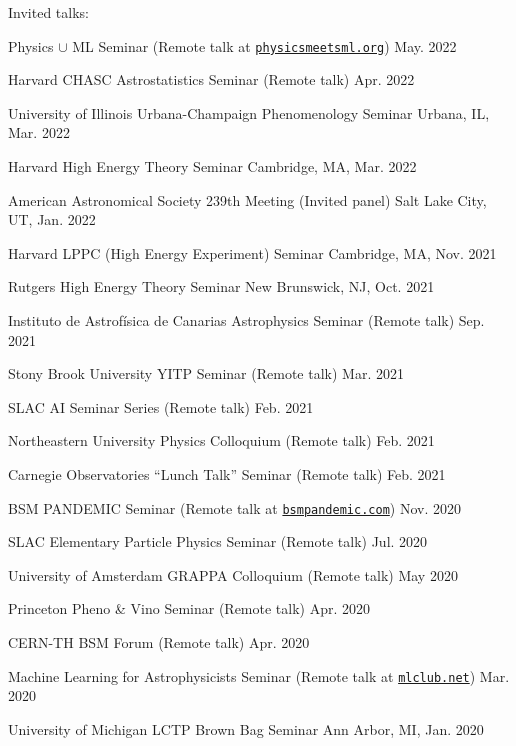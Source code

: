 \documentclass[letterpaper,11pt]{article}
\newenvironment{packed_itemize}{
\begin{itemize}[label=\raisebox{0.25ex}{\tiny$\bullet$}]
  \setlength{\itemsep}{3.9pt}
  \setlength{\parskip}{0pt}
  \setlength{\parsep}{0pt}}{\end{itemize}
}
\begin{document}
\noindent
Invited talks:
\begin{packed_itemize}
  \item Physics $\cup$ ML Seminar (Remote talk at \href{http://www.physicsmeetsml.org//}{\texttt{physicsmeetsml.org}}) \hfill May. 2022
  \item Harvard CHASC Astrostatistics Seminar (Remote talk)  \hfill Apr. 2022
  \item University of Illinois Urbana-Champaign Phenomenology Seminar  \hfill Urbana, IL, Mar. 2022
  \item Harvard High Energy Theory Seminar \hfill Cambridge, MA, Mar. 2022
  \item American Astronomical Society 239th Meeting (Invited panel)  \hfill Salt Lake City, UT, Jan. 2022
  \item Harvard LPPC (High Energy Experiment) Seminar \hfill Cambridge, MA, Nov. 2021
  \item Rutgers High Energy Theory Seminar \hfill New Brunswick, NJ, Oct. 2021
  \item Instituto de Astrof\'{i}sica de Canarias Astrophysics Seminar (Remote talk) \hfill Sep. 2021
  \item Stony Brook University YITP Seminar (Remote talk) \hfill Mar. 2021
  \item SLAC AI Seminar Series (Remote talk) \hfill Feb. 2021
  \item Northeastern University Physics Colloquium (Remote talk) \hfill Feb. 2021
  \item Carnegie Observatories ``Lunch Talk'' Seminar (Remote talk) \hfill Feb. 2021
  \item BSM PANDEMIC Seminar  (Remote talk at \href{https://www.bsmpandemic.com/}{\texttt{bsmpandemic.com}}) \hfill Nov. 2020
  \item SLAC Elementary Particle Physics Seminar (Remote talk) \hfill Jul. 2020
  \item University of Amsterdam GRAPPA Colloquium (Remote talk) \hfill May 2020
  \item Princeton Pheno \& Vino Seminar (Remote talk) \hfill Apr. 2020
  \item CERN-TH BSM Forum (Remote talk) \hfill  Apr. 2020
  \item Machine Learning for Astrophysicists Seminar (Remote talk at \href{https://docs.google.com/document/d/1GGtE-YIuAWlmpKSr38_kyiF-Fklszhkh4FkiYWzBAho/pub}{\texttt{mlclub.net}}) \hfill  Mar. 2020
  \item University of Michigan LCTP Brown Bag Seminar \hfill Ann Arbor, MI, Jan. 2020

\end{packed_itemize}
\end{document}
